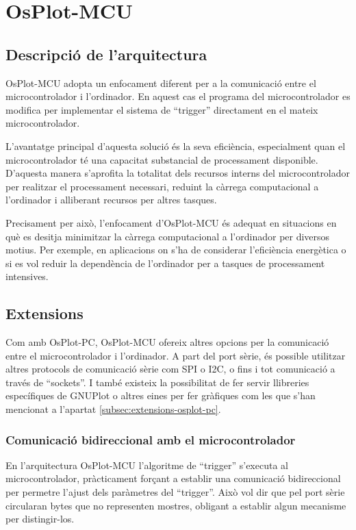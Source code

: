 \documentclass{tfgitic}[2023/06/30]
\begin{document}
\section{OsPlot-MCU}

\subsection{Descripció de l'arquitectura}

OsPlot-MCU adopta un enfocament diferent per a la comunicació entre el
microcontrolador i l'ordinador. En aquest cas el programa del
microcontrolador es modifica per implementar el sistema de ``trigger''
directament en el mateix microcontrolador.

\newpage

L'avantatge principal d'aquesta solució és la seva eficiència,
especialment quan el microcontrolador té una capacitat substancial de
processament disponible. D'aquesta manera s'aprofita la totalitat dels
recursos interns del microcontrolador per realitzar el processament
necessari, reduint la càrrega computacional a l'ordinador i alliberant
recursos per altres tasques.

Precisament per això, l'enfocament d'OsPlot-MCU és adequat en
situacions en què es desitja minimitzar la càrrega computacional a
l'ordinador per diversos motius. Per exemple, en aplicacions on s'ha
de considerar l'eficiència energètica o si es vol reduir la
dependència de l'ordinador per a tasques de processament intensives.

\subsection{Extensions}

Com amb OsPlot-PC, OsPlot-MCU ofereix altres opcions per la
comunicació entre el microcontrolador i l'ordinador. A part del port
sèrie, és possible utilitzar altres protocols de comunicació sèrie com
SPI o I2C, o fins i tot comunicació a través de ``sockets''. I també
existeix la possibilitat de fer servir llibreries específiques de
GNUPlot o altres eines per fer gràfiques com les que s'han mencionat a
l'apartat \ref{subsec:extensions-osplot-pc}.

\subsubsection{Comunicació bidireccional amb el microcontrolador}

En l'arquitectura OsPlot-MCU l'algoritme de ``trigger'' s'executa al
microcontrolador, pràcticament forçant a establir una comunicació
bidireccional per permetre l'ajust dels paràmetres del ``trigger''.
Això vol dir que pel port sèrie circularan bytes que no representen
mostres, obligant a establir algun mecanisme per distingir-los.
\end{document}
